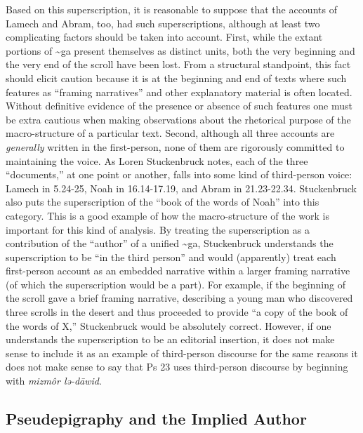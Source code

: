 Based on this superscription, it is reasonable to suppose that the
accounts of Lamech and Abram, too, had such superscriptions, although at
least two complicating factors should be taken into account. First,
while the extant portions of \textasciitilde{}ga present themselves as
distinct units, both the very beginning and the very end of the scroll
have been lost. From a structural standpoint, this fact should elicit
caution because it is at the beginning and end of texts where such
features as ``framing narratives'' and other explanatory material is
often located. Without definitive evidence of the presence or absence of
such features one must be extra cautious when making observations about
the rhetorical purpose of the macro-structure of a particular text.
Second, although all three accounts are \emph{generally} written in the
first-person, none of them are rigorously committed to maintaining the
voice. As Loren Stuckenbruck notes, each of the three ``documents,'' at
one point or another, falls into some kind of third-person voice: Lamech
in 5.24-25, Noah in 16.14-17.19, and Abram in 21.23-22.34. Stuckenbruck
also puts the superscription of the ``book of the words of Noah'' into
this category. This is a good example of how the macro-structure of the
work is important for this kind of analysis. By treating the
superscription as a contribution of the ``author'' of a unified
\textasciitilde{}ga, Stuckenbruck understands the superscription to be
``in the third person'' and would (apparently) treat each first-person
account as an embedded narrative within a larger framing narrative (of
which the superscription would be a part). For example, if the beginning
of the scroll gave a brief framing narrative, describing a young man who
discovered three scrolls in the desert and thus proceeded to provide ``a
copy of the book of the words of X,'' Stuckenbruck would be absolutely
correct. However, if one understands the superscription to be an
editorial insertion, it does not make sense to include it as an example
of third-person discourse for the same reasons it does not make sense to
say that Ps 23 uses third-person discourse by beginning with
\emph{mizmôr
lə-dāwid}.\autocites[315--316]{stuckenbruck_roitman-etal2011}[See
also][15--16. Even supposing a single author for \textasciitilde{}ga, as
Stuckenbruck and others imply, I am still inclined to consider the
superscriptions separately from the former examples because they would
exist outside the frame of each embedded
narrative.]{bernstein_chazon-etal1999}

\hypertarget{pseudepigraphy-and-the-implied-author}{%
\subsection{Pseudepigraphy and the Implied
Author}\label{pseudepigraphy-and-the-implied-author}}

